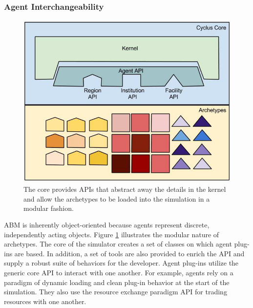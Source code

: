 \subsubsection{Agent Interchangeability}\label{sec:interchangeability}


\begin{figure}[htbp!]
\begin{center}
\includegraphics[width=\textwidth]{./images/framework}
\end{center}
\caption{The \Cyclus core provides \gls{API}s that abstract away the details in 
the kernel and allow the archetypes to be loaded into the simulation in a modular 
fashion.}
\label{fig:framework}
\end{figure}

\gls{ABM} is inherently object-oriented because agents represent 
discrete, independently acting objects.  Figure \ref{fig:framework} illustrates
the modular nature of \Cyclus archetypes.  The core of the \Cyclus simulator 
creates a set of classes on which agent plug-ins 
are based. In addition, a set of tools are also provided to enrich the 
\gls{API} and supply a robust suite of behaviors for the developer. 
Agent plug-ins utilize the generic core \gls{API} to interact with one another.  For 
example, agents rely on a paradigm of dynamic loading and clean plug-in 
behavior at the start of the simulation. They also use the resource exchange 
paradigm \gls{API} for trading resources with one another. 

